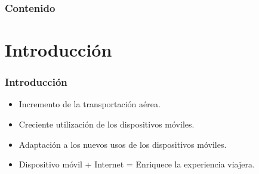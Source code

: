 \documentclass[12pt]{beamer}
\begin{document}
\begin{frame}
\frametitle{Contenido}
\tableofcontents
\end{frame}

\section{Introducción}

\begin{frame}
	\frametitle{Introducción}
	\begin{block}{}
		\begin{itemize}
		\item Incremento de la transportación aérea.
		\item Creciente utilización de los dispositivos móviles.
		\item Adaptación a los nuevos usos de los dispositivos móviles.
		\item Dispositivo móvil + Internet = Enriquece la experiencia viajera.
	\end{itemize}
	\end{block}

\end{frame}
\end{document}
